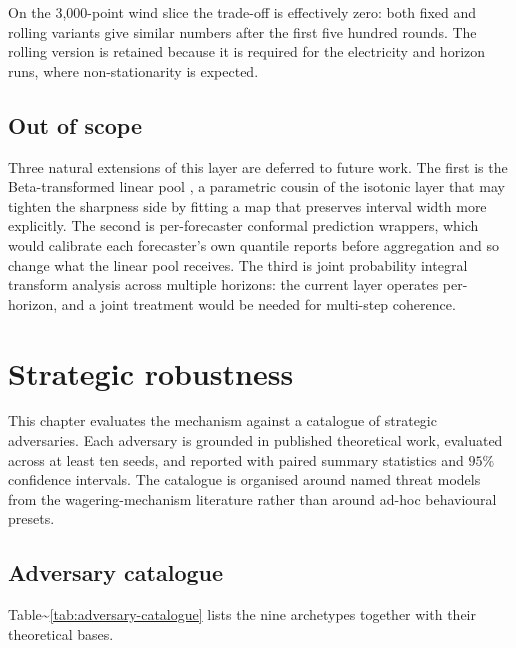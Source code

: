 \documentclass[
  11pt,
  a4paper,
  oneside]{report}
\begin{document}
On the 3,000-point wind slice the trade-off is effectively zero: both
fixed and rolling variants give similar numbers after the first five
hundred rounds. The rolling version is retained because it is required
for the electricity and horizon runs, where non-stationarity is
expected.

\section{Out of scope}\label{out-of-scope}

Three natural extensions of this layer are deferred to future work. The
first is the Beta-transformed linear pool \citep{gneiting2013combining},
a parametric cousin of the isotonic layer that may tighten the sharpness
side by fitting a map that preserves interval width more explicitly. The
second is per-forecaster conformal prediction wrappers, which would
calibrate each forecaster's own quantile reports before aggregation and
so change what the linear pool receives. The third is joint probability
integral transform analysis across multiple horizons: the current layer
operates per-horizon, and a joint treatment would be needed for
multi-step coherence.

\chapter{Strategic robustness}\label{ch:robustness}

This chapter evaluates the mechanism against a catalogue of strategic
adversaries. Each adversary is grounded in published theoretical work,
evaluated across at least ten seeds, and reported with paired summary
statistics and \(95\%\) confidence intervals. The catalogue is organised
around named threat models from the wagering-mechanism literature rather
than around ad-hoc behavioural presets.

\section{Adversary catalogue}\label{adversary-catalogue}

Table\textasciitilde{}\ref{tab:adversary-catalogue} lists the nine
archetypes together with their theoretical bases.
\end{document}
